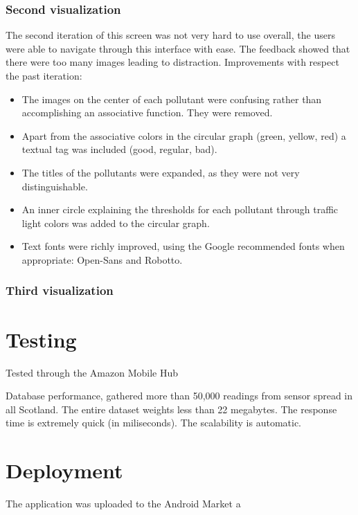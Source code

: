 \subsubsection{Second visualization}
The second iteration of this screen was not very hard to use overall, the users were able to navigate through this interface with ease. The feedback showed that there were too many images leading to distraction. 
Improvements with respect the past iteration:
\begin{itemize}
	\item The images on the center of each pollutant were confusing rather than accomplishing an associative function. They were removed.
    \item Apart from the associative colors in the circular graph (green, yellow, red) a textual tag was included (good, regular, bad).
    \item The titles of the pollutants were expanded, as they were not very distinguishable. 
    \item An inner circle explaining the thresholds for each pollutant through traffic light colors was added to the circular graph. 
    \item Text fonts were richly improved, using the Google recommended fonts when appropriate:  Open-Sans and Robotto.
	
\end{itemize}

\subsubsection{Third visualization}

\section{Testing}
Tested through the Amazon Mobile Hub

Database performance, gathered more than 50,000 readings from sensor spread in all Scotland. The entire dataset weights less than 22 megabytes. The response time is extremely quick (in miliseconds). The scalability is automatic. 


\section{Deployment}
The application was uploaded to the Android Market a